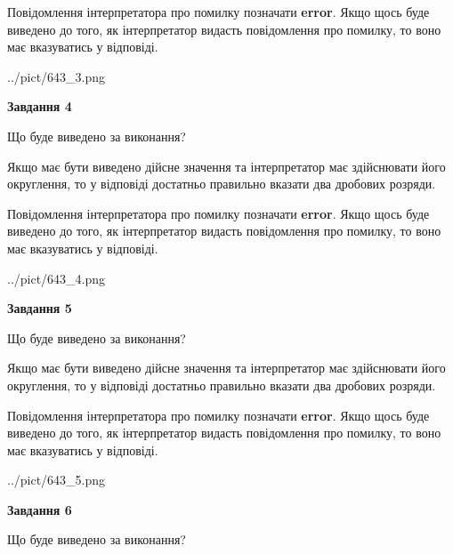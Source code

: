 \documentclass[12pt, ukrainian]{article}
\begin{document}
{\begin {Large}
Повідомлення інтерпретатора про помилку позначати \textbf{error}.
Якщо щось буде виведено до того, як інтерпретатор видасть повідомлення про помилку, 
то воно має вказуватись у відповіді. \par

\begin{center}
	{../pict/643_3.png}
\end{center}
\newpage

{\begin {center}\textbf{Завдання 4}\end {center}}\par
Що буде виведено за виконання? \par

Якщо має бути виведено дійсне значення та інтерпретатор має здійснювати його округлення, 
то у відповіді достатньо правильно вказати два дробових розряди.

Повідомлення інтерпретатора про помилку позначати \textbf{error}.
Якщо щось буде виведено до того, як інтерпретатор видасть повідомлення про помилку, 
то воно має вказуватись у відповіді. \par

\begin{center}
	{../pict/643_4.png}
\end{center}
\newpage

{\begin {center}\textbf{Завдання 5}\end {center}}\par
Що буде виведено за виконання? \par

Якщо має бути виведено дійсне значення та інтерпретатор має здійснювати його округлення, 
то у відповіді достатньо правильно вказати два дробових розряди.

Повідомлення інтерпретатора про помилку позначати \textbf{error}.
Якщо щось буде виведено до того, як інтерпретатор видасть повідомлення про помилку, 
то воно має вказуватись у відповіді. \par

\begin{center}
	{../pict/643_5.png}
\end{center}
\newpage

{\begin {center}\textbf{Завдання 6}\end {center}}\par
Що буде виведено за виконання? \par


\end{Large}}
\end{document}
